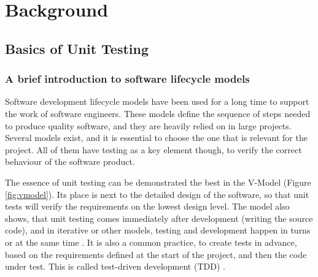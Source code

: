 \chapter{Background}
\section{Basics of Unit Testing}

\subsection{A brief introduction to software lifecycle models}
Software development lifecycle models have been used for a long time to support the work of software engineers. These models define the sequence of steps needed to produce quality software, and they are heavily relied on in large projects. Several models exist, and it is essential to choose the one that is relevant for the project. All of them have testing as a key element though, to verify the correct behaviour of the software product. 

The essence of unit testing can be demonstrated the best in the V-Model (Figure \ref{fig:vmodel}). Its place is next to the detailed design of the software, so that unit tests will verify the requirements on the lowest design level. The model also shows, that unit testing comes immediately after development (writing the source code), and in iterative or other models, testing and development happen in turns or at the same time \cite{Ruparelia:2010:SDL:1764810.1764814}. It is also a common practice, to create tests in advance, based on the requirements defined at the start of the project, and then the code under test. This is called test-driven development (TDD) \cite{1510569}.



